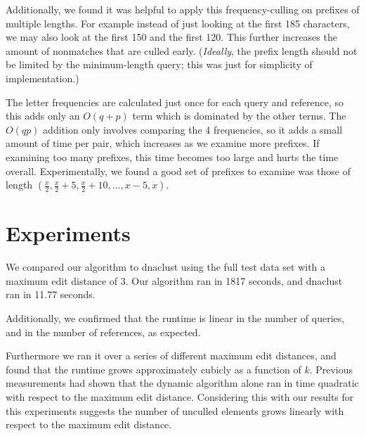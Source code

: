 \documentclass[11pt,letterpaper]{article}
\begin{document}
Additionally, we found it was helpful to apply this frequency-culling on prefixes of multiple lengths. For example instead of just looking at the first 185 characters, we may also look at the first 150 and the first 120. This further increases the amount of nonmatches that are culled early. (\emph{Ideally}, the prefix length should not be limited by the minimum-length query; this was just for simplicity of implementation.)

The letter frequencies are calculated just once for each query and reference, so this adds only an $O(q+p)$ term which is dominated by the other terms. The $O(qp)$ addition only involves comparing the 4 frequencies, so it adds a small amount of time per pair, which increases as we examine more prefixes. If examining too many prefixes, this time becomes too large and hurts the time overall. Experimentally, we found a good set of prefixes to examine was those of length $(\frac{x}{2},\frac{x}{2}+5,\frac{x}{2}+10,\dots,x-5,x)$.

\section{Experiments}
We compared our algorithm to dnaclust using the full test data set with a maximum edit distance of 3. Our algorithm ran in 1817 seconds, and dnaclust ran in 11.77 seconds.

Additionally, we confirmed that the runtime is linear in the number of queries, and in the number of references, as expected. 

Furthermore we ran it over a series of different maximum edit distances, and found that the runtime grows approximately cubicly as a function of $k$. Previous measurements had shown that the dynamic algorithm alone ran in time quadratic with respect to the maximum edit distance. Considering this with our results for this experiments suggests the number of unculled elements grows linearly with respect to the maximum edit distance.
\end{document}
